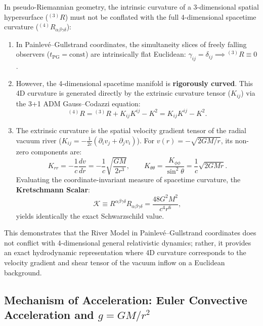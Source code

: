 \documentclass[11pt,a4paper]{article}
\begin{document}
In pseudo-Riemannian geometry, the intrinsic curvature of a 3-dimensional spatial hypersurface ($^{(3)}R$) must not be conflated with the full 4-dimensional spacetime curvature ($^{(4)}R_{\alpha\beta\gamma\delta}$):
\begin{enumerate}
    \item In Painlevé--Gullstrand coordinates, the simultaneity slices of freely falling observers ($t_{\mathrm{PG}} = \text{const}$) are intrinsically flat Euclidean: $\gamma_{ij} = \delta_{ij} \implies {}^{(3)}R \equiv 0$.
    \item However, the 4-dimensional spacetime manifold is \textbf{rigorously curved}. This 4D curvature is generated directly by the extrinsic curvature tensor ($K_{ij}$) via the 3+1 ADM Gauss--Codazzi equation:
    \begin{equation}
        {}^{(4)}R = {}^{(3)}R + K_{ij} K^{ij} - K^2 = K_{ij} K^{ij} - K^2.
        \label{eq:gauss_codazzi_ispat_en}
    \end{equation}
    \item The extrinsic curvature is the spatial velocity gradient tensor of the radial vacuum river ($K_{ij} = -\frac{1}{2c}(\partial_i v_j + \partial_j v_i)$). For $v(r) = -\sqrt{2GM/r}$, its non-zero components are:
    \begin{equation}
        K_{rr} = -\frac{1}{c} \frac{dv}{dr} = -\frac{1}{c} \sqrt{\frac{GM}{2r^3}}, \qquad K_{\theta\theta} = \frac{K_{\phi\phi}}{\sin^2\theta} = \frac{1}{c} \sqrt{2GMr}.
    \end{equation}
    Evaluating the coordinate-invariant measure of spacetime curvature, the \textbf{Kretschmann Scalar}:
    \begin{equation}
        \mathcal{K} \equiv R^{\alpha\beta\gamma\delta} R_{\alpha\beta\gamma\delta} = \frac{48 G^2 M^2}{c^4 r^6},
        \label{eq:kretschmann_ispat_en}
    \end{equation}
    yields identically the exact Schwarzschild value.
\end{enumerate}

This demonstrates that the River Model in Painlevé--Gullstrand coordinates does not conflict with 4-dimensional general relativistic dynamics; rather, it provides an exact hydrodynamic representation where 4D curvature corresponds to the velocity gradient and shear tensor of the vacuum inflow on a Euclidean background.

\subsection{Mechanism of Acceleration: Euler Convective Acceleration and $g = GM/r^2$}
\label{sec:ivmelenme_ispat_p1}
\end{document}
